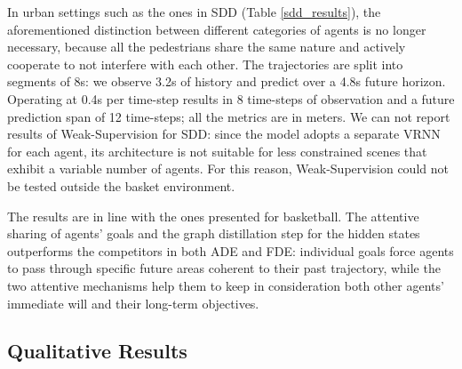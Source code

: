 \documentclass[10pt,a4paper,conference]{IEEEtran}
\begin{document}
\bigbreak

In urban settings such as the ones in SDD (Table \ref{sdd_results}), the aforementioned distinction between different categories of agents is no longer necessary, because all the pedestrians share the same nature and actively cooperate to not interfere with each other. 
The trajectories are split into segments of 8s: we observe 3.2s of history and predict over a 4.8s future horizon. Operating at 0.4s per time-step results in 8 time-steps of observation and a future prediction span of 12 time-steps; all the metrics are in meters. We can not report results of Weak-Supervision for SDD: since the model adopts a separate VRNN for each agent, its architecture is not suitable for less constrained scenes that exhibit a variable number of agents. For this reason, Weak-Supervision could not be tested outside the basket environment.

The results are in line with the ones presented for basketball. The attentive sharing of agents' goals and the graph distillation step for the hidden states outperforms the competitors in both ADE and FDE: individual goals force agents to pass through specific future areas coherent to their past trajectory, while the two attentive mechanisms help them to keep in consideration both other agents' immediate will and their long-term objectives.


\subsection{Qualitative Results}
\end{document}
